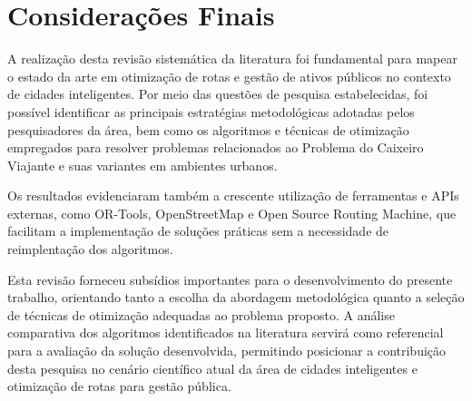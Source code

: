 \section{Considerações Finais}


A realização desta revisão sistemática da literatura foi fundamental para mapear o estado da arte 
em otimização de rotas e gestão de ativos públicos no contexto de cidades inteligentes. Por meio das 
questões de pesquisa estabelecidas, foi possível identificar as principais estratégias metodológicas 
adotadas pelos pesquisadores da área, bem como os algoritmos e técnicas de otimização empregados 
para resolver problemas relacionados ao Problema do Caixeiro Viajante e suas variantes em ambientes 
urbanos.

Os resultados evidenciaram também a crescente utilização de ferramentas e APIs externas, como 
OR-Tools, OpenStreetMap e Open Source Routing Machine, que facilitam a implementação de soluções 
práticas sem a necessidade de reimplentação dos algoritmos.

Esta revisão forneceu subsídios importantes para o desenvolvimento do presente trabalho, 
orientando tanto a escolha da abordagem metodológica quanto a seleção de técnicas de otimização 
adequadas ao problema proposto. A análise comparativa dos algoritmos identificados na literatura 
servirá como referencial para a avaliação da solução desenvolvida, permitindo posicionar a 
contribuição desta pesquisa no cenário científico atual da área de cidades inteligentes e 
otimização de rotas para gestão pública.

